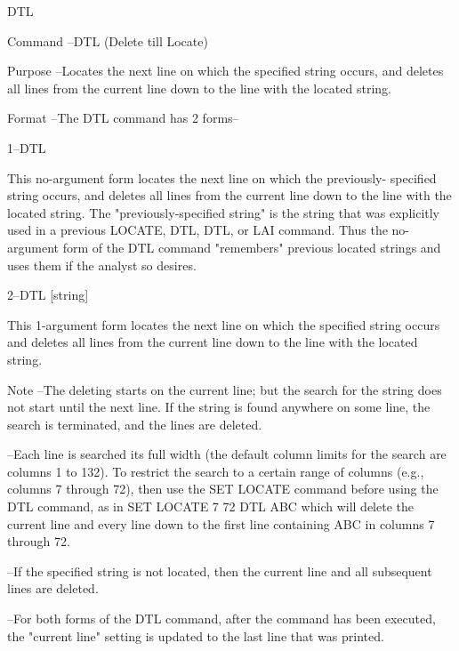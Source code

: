 DTL
 
Command --DTL (Delete till Locate)
 
Purpose --Locates the next line on which
          the specified string occurs, and
          deletes all lines from the current line
          down to the line with the located string.
 
Format  --The DTL command has 2 forms--
 
       1--DTL
 
          This no-argument form locates the
          next line on which the previously-
          specified string occurs, and
          deletes all lines from the current line
          down to the line with the located string.
          The "previously-specified string" is
          the string that was explicitly used in a
          previous LOCATE, DTL, DTL, or LAI command.
          Thus the no-argument form of the DTL command
          "remembers" previous located strings
          and uses them if the analyst so desires.
 
       2--DTL     [string]
 
          This 1-argument form locates the
          next line on which the specified
          string occurs and  deletes all lines
          from the current line down to the line
          with the located string.
 
Note    --The deleting starts on the current line;
          but the search for the string
          does not start until the next line.
          If the string is found anywhere on
          some line, the search is terminated,
          and the lines are deleted.
 
        --Each line is searched its full width
          (the default column limits for the search
          are columns 1 to 132).
          To restrict the search to a certain range  of
          columns (e.g., columns 7 through 72), then
          use the SET LOCATE command before using
          the DTL command, as in
             SET LOCATE 7 72
             DTL ABC
          which will delete the current line
          and every line down to the first
          line containing ABC in columns
          7 through 72.
 
        --If the specified string is not located,
          then the current line and all subsequent
          lines are deleted.
 
        --For both forms of the DTL command, after the
          command has been executed, the "current line"
          setting is updated to the last line that was
          printed.
 
